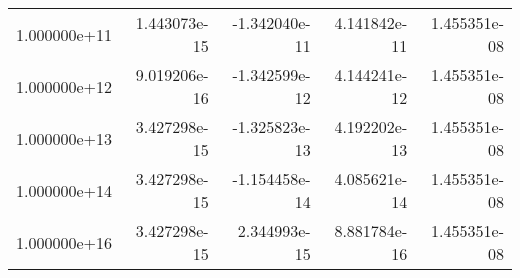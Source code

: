 \begin{tabular}{lrrrr}
1.000000e+11 &              1.443073e-15 &                   -1.342040e-11 &  4.141842e-11 &  1.455351e-08 \\
1.000000e+12 &              9.019206e-16 &                   -1.342599e-12 &  4.144241e-12 &  1.455351e-08 \\
1.000000e+13 &              3.427298e-15 &                   -1.325823e-13 &  4.192202e-13 &  1.455351e-08 \\
1.000000e+14 &              3.427298e-15 &                   -1.154458e-14 &  4.085621e-14 &  1.455351e-08 \\
1.000000e+16 &              3.427298e-15 &                    2.344993e-15 &  8.881784e-16 &  1.455351e-08 \\
\bottomrule
\end{tabular}
